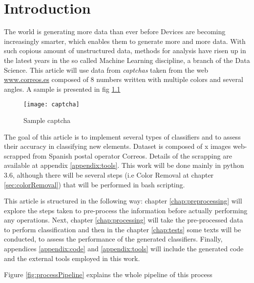 \chapter{Introduction}
The world is generating more data than ever before\cite{forbesDataScience} Devices are becoming increasingly smarter, which enables them to generate more and more data. With such copious amount of unstructured data, methods for analysis have risen up in the latest years in the so called Machine Learning discipline, a branch of the Data Science. This article will use data from \textit{captchas} taken from the web \url{www.correos.es} composed of 8 numbers written with multiple colors and several angles. A sample is presented in fig \ref{fig:sampleCaptcha}\medskip
\begin{figure}[h]
    \centering
    \texttt{[image: captcha]}
    \caption{Sample captcha}
    \label{fig:sampleCaptcha}
\end{figure}

 

The goal of this article is to implement several types of classifiers and to assess their accuracy in classifying new elements. Dataset is composed of x images web-scrapped from Spanish postal operator Correos. Details of the scrapping are available at appendix \ref{appendix:tools}. This work will be done mainly in python 3.6, although there will be several steps (i.e Color Removal at chapter \ref{sec:colorRemoval}) that will be performed in bash scripting.\medskip

This article is structured in the following way: chapter \ref{chap:preprocessing} will explore the steps taken to pre-process the information before actually performing any operations. Next, chapter \ref{chap:processing} will take the pre-processed data to perform classification and then in the chapter \ref{chap:tests} some texts will be conducted, to assess the performance of the generated classifiers. Finally, appendices \ref{appendix:code} and \ref{appendix:tools} will include the generated code and the external tools employed in this work.\medskip

Figure \ref{fig:processPipeline} explains the whole pipeline of this process


